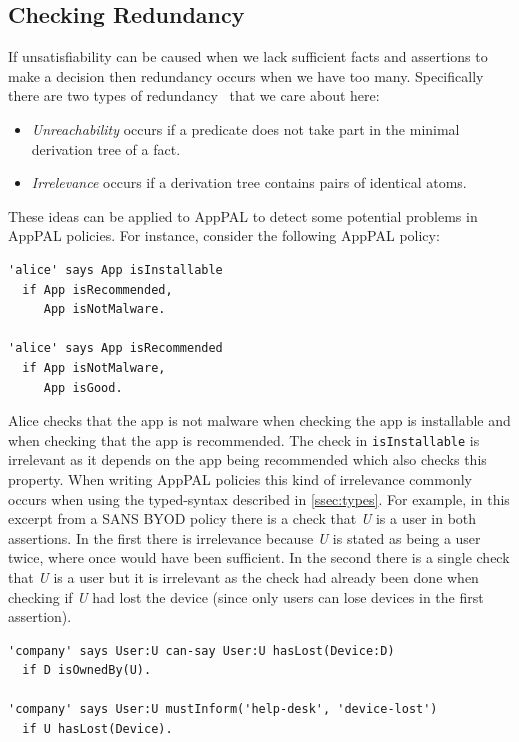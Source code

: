 \documentclass[thesis.tex]{subfiles}
\begin{document}
\subsection{Checking Redundancy}
\label{ssec:redundancy}

If unsatisfiability can be caused when we lack sufficient facts and assertions
to make a decision then redundancy occurs when we have too many. Specifically
there are two types of redundancy~\cite{alon_levy_constraints_1992} that we care
about here:

\begin{itemize}
\item \emph{Unreachability} occurs if a predicate does not take part in the
  minimal derivation tree of a fact.
\item \emph{Irrelevance} occurs if a derivation tree contains pairs of identical atoms.
\end{itemize}

These ideas can be applied to AppPAL to detect some potential problems in AppPAL policies. For instance,  consider the
following AppPAL policy:

\noindent\begin{minipage}{\textwidth}
\begin{lstlisting}
'alice' says App isInstallable
  if App isRecommended,
     App isNotMalware.

'alice' says App isRecommended
  if App isNotMalware,
     App isGood.
\end{lstlisting}
\end{minipage}

Alice checks that the app is not malware when checking the app is
installable and when checking that the app is recommended.  The check
in \texttt{isInstallable} is irrelevant as it depends on the app being
recommended which also checks this property.  When writing AppPAL
policies this kind of irrelevance commonly occurs when using the
typed-syntax described in \autoref{ssec:types}. For example, in this
excerpt from a SANS BYOD policy there is a check that \emph{U} is a
user in both assertions.  In the first there is irrelevance because
\emph{U} is stated as being a user twice, where once would have been
sufficient.  In the second there is a single check that \emph{U} is a
user but it is irrelevant as the check had already been done when
checking if \emph{U} had lost the device (since only users can lose
devices in the first assertion).

\begin{lstlisting}
'company' says User:U can-say User:U hasLost(Device:D)
  if D isOwnedBy(U).

'company' says User:U mustInform('help-desk', 'device-lost')
  if U hasLost(Device).
\end{lstlisting}
\end{document}
